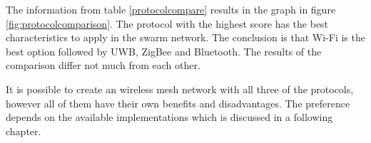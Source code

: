 \documentclass[10pt,a4paper]{article}
\begin{document}
\begin{table}[H]
\centering
\caption{The comparison of the protocols. The characteristics of each of the protocols get evaluated. The scoring is based on a number between zero and one, where zero is bad and one is good. The total score gives the best protocol for this situation.}
\label{protocolcompare}
\end{table}

The information from table \ref{protocolcompare} results in the graph in figure \ref{fig:protocolcomparison}. The protocol with the highest score has the best characteristics to apply in the swarm network. The conclusion is that Wi-Fi is the best option followed by UWB, ZigBee and Bluetooth. The results of the comparison differ not much from each other. 

It is possible to create an wireless mesh network with all three of the protocols, however all of them have their own benefits and disadvantages. The preference depends on the available implementations which is discussed in a following chapter.
\end{document}
